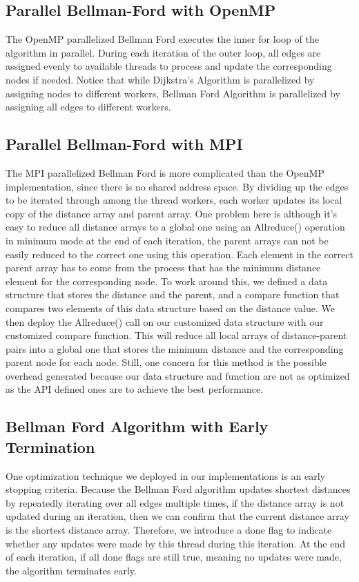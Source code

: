 \documentclass[12pt]{article}
\begin{document}
\subsection{Parallel Bellman-Ford with OpenMP}
The OpenMP parallelized Bellman Ford executes the inner for loop of the algorithm in parallel. During each iteration of the outer loop, all edges are assigned evenly to available threads to process and update the corresponding nodes if needed. Notice that while Dijkstra's Algorithm is parallelized by assigning nodes to different workers, Bellman Ford Algorithm is parallelized by assigning all edges to different workers.

\subsection{Parallel Bellman-Ford with MPI}
The MPI parallelized Bellman Ford is more complicated than the OpenMP implementation, since there is no shared address space. By dividing up the edges to be iterated through among the thread workers, each worker updates its local copy of the distance array and parent array. One problem here is although it's easy to reduce all distance arrays to a global one using an Allreduce() operation in minimum mode at the end of each iteration, the parent arrays can not be easily reduced to the correct one using this operation. Each element in the correct parent array has to come from the process that has the minimum distance element for the corresponding node. To work around this, we defined a data structure that stores the distance and the parent, and a compare function that compares two elements of this data structure based on the distance value. We then deploy the Allreduce() call on our customized data structure with our customized compare function. This will reduce all local arrays of distance-parent pairs into a global one that stores the minimum distance and the corresponding parent node for each node. Still, one concern for this method is the possible overhead generated because our data structure and function are not as optimized as the API defined ones are to achieve the best performance.

\subsection{Bellman Ford Algorithm with Early Termination}
One optimization technique we deployed in our implementations is an early stopping criteria. Because the Bellman Ford algorithm updates shortest distances by repeatedly iterating over all edges multiple times, if the distance array is not updated during an iteration, then we can confirm that the current distance array is the shortest distance array. Therefore, we introduce a done flag to indicate whether any updates were made by this thread during this iteration. At the end of each iteration, if all done flags are still true, meaning no updates were made, the algorithm terminates early.
\end{document}
